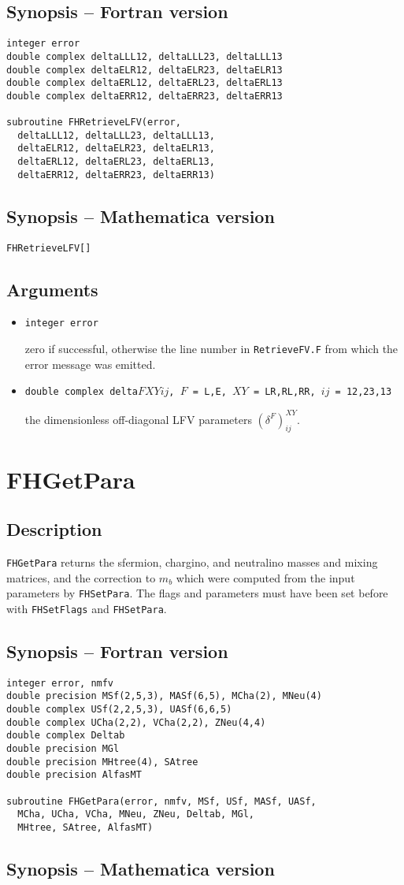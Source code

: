 \documentclass[12pt,a4paper]{report}
\newcommand{\CODE}[1]{\texttt{#1}}
\newcommand{\VAROUT}[1]{%
  \item[\fbox{\scriptsize\textsc{out}}]
  \CODE{#1}\par}
\newcommand{\ROUTINE}[1]{\pagebreak
  \section*{#1}%
  \addcontentsline{toc}{section}{#1}}
\newcommand{\DESCRIPTION}{\subsection*{Description}}
\newcommand{\FSYNOPSIS}{\subsection*{Synopsis -- Fortran version}}
\newcommand{\MSYNOPSIS}{\subsection*{Synopsis -- Mathematica version}}
\newcommand{\ARGUMENTS}{\subsection*{Arguments}\begin{itemize}}
\newcommand{\ENDARGUMENTS}{\end{itemize}}
\begin{document}
\FSYNOPSIS

\begin{verbatim}
integer error
double complex deltaLLL12, deltaLLL23, deltaLLL13
double complex deltaELR12, deltaELR23, deltaELR13
double complex deltaERL12, deltaERL23, deltaERL13
double complex deltaERR12, deltaERR23, deltaERR13

subroutine FHRetrieveLFV(error,
  deltaLLL12, deltaLLL23, deltaLLL13,
  deltaELR12, deltaELR23, deltaELR13,
  deltaERL12, deltaERL23, deltaERL13,
  deltaERR12, deltaERR23, deltaERR13)
\end{verbatim}

\MSYNOPSIS

\begin{verbatim}
FHRetrieveLFV[]
\end{verbatim}

\ARGUMENTS

\VAROUT{integer error}
zero if successful, otherwise the line number in \CODE{RetrieveFV.F} 
from which the error message was emitted.

\VAROUT{double complex delta$F$$XY$$ij$, $F$ = L,E, $XY$ = LR,RL,RR,
$ij$ = 12,23,13}

the dimensionless off-diagonal LFV parameters $(\delta^F)^{XY}_{ij}$.

\ENDARGUMENTS


\ROUTINE{FHGetPara}

\DESCRIPTION

\CODE{FHGetPara} returns the sfermion, chargino, and neutralino masses
and mixing matrices, and the correction to $m_b$ which were computed
from the input parameters by \CODE{FHSetPara}.  The flags and
parameters must have been set before with \CODE{FHSetFlags} and
\CODE{FHSetPara}.

\FSYNOPSIS

\begin{verbatim}
integer error, nmfv
double precision MSf(2,5,3), MASf(6,5), MCha(2), MNeu(4)
double complex USf(2,2,5,3), UASf(6,6,5)
double complex UCha(2,2), VCha(2,2), ZNeu(4,4)
double complex Deltab
double precision MGl
double precision MHtree(4), SAtree
double precision AlfasMT

subroutine FHGetPara(error, nmfv, MSf, USf, MASf, UASf,
  MCha, UCha, VCha, MNeu, ZNeu, Deltab, MGl,
  MHtree, SAtree, AlfasMT)
\end{verbatim}

\MSYNOPSIS
\end{document}
